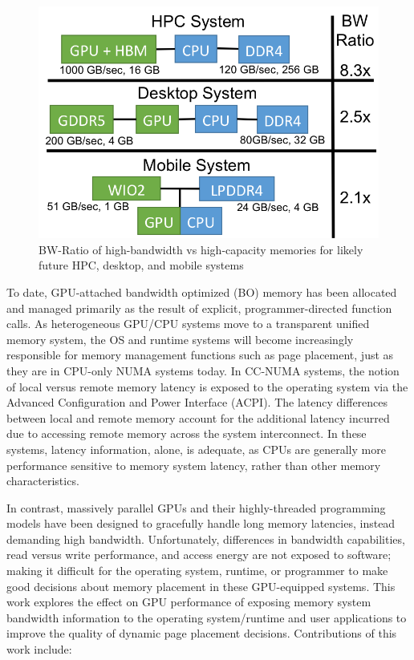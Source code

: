 \begin{figure}[t]
    \includegraphics[width=\columnwidth]{asplos2015/figures/arch}
    \caption{BW-Ratio of high-bandwidth vs high-capacity memories for likely future HPC, desktop, and mobile systems}
    \label{fig:arch}
\end{figure}

To date, GPU-attached bandwidth optimized (BO) memory has been allocated and 
managed primarily as the result of explicit, programmer-directed function calls. 
As heterogeneous GPU/CPU systems move to a transparent unified 
memory system, the OS and runtime systems will become increasingly responsible 
for memory management functions such as page placement, just as they are in CPU-only NUMA
systems today. In CC-NUMA systems, the notion of local versus remote memory 
latency is exposed to the operating system via the Advanced Configuration and Power Interface (ACPI). The 
latency differences between local and remote memory account for the additional 
latency incurred due to accessing remote memory across the system interconnect.  In these 
systems, latency information, alone, is adequate, as CPUs are generally more 
performance sensitive to memory system latency, rather than other 
memory characteristics.

In contrast, massively parallel GPUs and their highly-threaded programming 
models have been designed to gracefully handle long memory latencies, instead 
demanding high bandwidth. Unfortunately, differences in bandwidth capabilities, 
read versus write performance, and access energy are not exposed to software; 
making it difficult for the operating system, runtime, or programmer to make 
good decisions about memory placement in these GPU-equipped systems. This 
work explores the effect on GPU performance of exposing memory system bandwidth 
information to the operating system/runtime and 
user applications to improve the quality of dynamic page placement decisions. 
Contributions of this work include:

